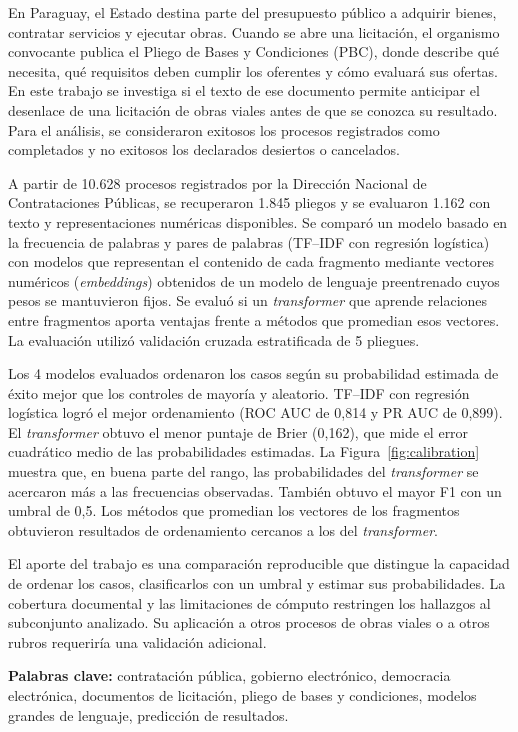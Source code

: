 \clearpage
\begin{resumen}
En Paraguay, el Estado destina parte del presupuesto público a adquirir bienes, contratar servicios y ejecutar obras. Cuando se abre una licitación, el organismo convocante publica el Pliego de Bases y Condiciones (PBC), donde describe qué necesita, qué requisitos deben cumplir los oferentes y cómo evaluará sus ofertas. En este trabajo se investiga si el texto de ese documento permite anticipar el desenlace de una licitación de obras viales antes de que se conozca su resultado. Para el análisis, se consideraron exitosos los procesos registrados como completados y no exitosos los declarados desiertos o cancelados.

A partir de 10.628 procesos registrados por la Dirección Nacional de Contrataciones Públicas, se recuperaron 1.845 pliegos y se evaluaron 1.162 con texto y representaciones numéricas disponibles. Se comparó un modelo basado en la frecuencia de palabras y pares de palabras (TF--IDF con regresión logística) con modelos que representan el contenido de cada fragmento mediante vectores numéricos (\textit{embeddings}) obtenidos de un modelo de lenguaje preentrenado cuyos pesos se mantuvieron fijos. Se evaluó si un \textit{transformer} que aprende relaciones entre fragmentos aporta ventajas frente a métodos que promedian esos vectores. La evaluación utilizó validación cruzada estratificada de 5 pliegues.

Los 4 modelos evaluados ordenaron los casos según su probabilidad estimada de éxito mejor que los controles de mayoría y aleatorio. TF--IDF con regresión logística logró el mejor ordenamiento (ROC AUC de 0,814 y PR AUC de 0,899). El \textit{transformer} obtuvo el menor puntaje de Brier (0,162), que mide el error cuadrático medio de las probabilidades estimadas. La Figura~\ref{fig:calibration} muestra que, en buena parte del rango, las probabilidades del \textit{transformer} se acercaron más a las frecuencias observadas. También obtuvo el mayor F1 con un umbral de 0,5. Los métodos que promedian los vectores de los fragmentos obtuvieron resultados de ordenamiento cercanos a los del \textit{transformer}.

El aporte del trabajo es una comparación reproducible que distingue la capacidad de ordenar los casos, clasificarlos con un umbral y estimar sus probabilidades. La cobertura documental y las limitaciones de cómputo restringen los hallazgos al subconjunto analizado. Su aplicación a otros procesos de obras viales o a otros rubros requeriría una validación adicional.

\textbf{Palabras clave:} contratación pública, gobierno electrónico, democracia electrónica, documentos de licitación, pliego de bases y condiciones, modelos grandes de lenguaje, predicción de resultados.
\end{resumen}
